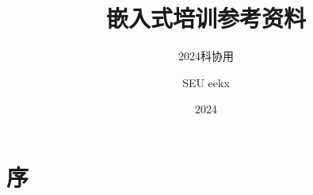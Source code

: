 \documentclass[cn,newtx,15pt]{elegantbook}
\title{嵌入式培训参考资料}
\subtitle{2024科协用}
\author{SEU eekx}
\date{2024}
\institute{Southeast University, School of Electronics Engineering}
\begin{document}
\maketitle

\frontmatter
\tableofcontents
\newpage

\chapter{序}



\mainmatter






\end{document}

